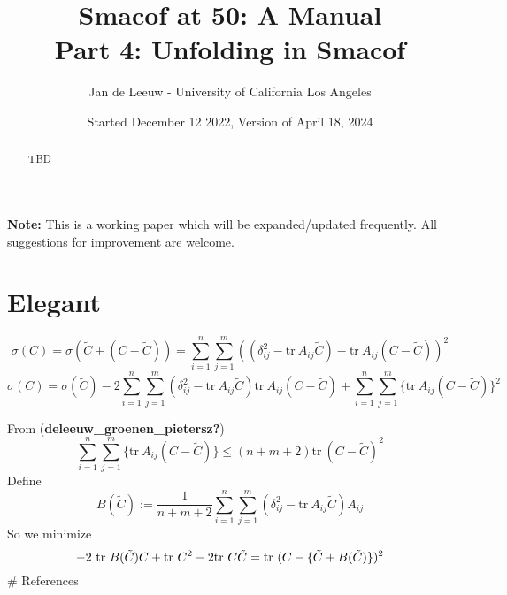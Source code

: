 \documentclass[
  12pt,
]{article}
\title{Smacof at 50: A Manual\\
Part 4: Unfolding in Smacof}
\author{Jan de Leeuw - University of California Los Angeles}
\date{Started December 12 2022, Version of April 18, 2024}
\begin{document}
\maketitle
\begin{abstract}
TBD
\end{abstract}

{
\setcounter{tocdepth}{3}
\tableofcontents
}
\textbf{Note:} This is a working paper which will be expanded/updated frequently. All suggestions for improvement are welcome.

\section{Elegant}\label{elegant}

\[
\sigma(C)=\sigma(\tilde C+(C-\tilde C))=\sum_{i=1}^n\sum_{j=1}^m((\delta_{ij}^2-\text{tr}\ A_{ij}\tilde C)-\text{tr}\ A_{ij}(C-\tilde C))^2
\]
\[
\sigma(C)=\sigma(\tilde C)-2\sum_{i=1}^n\sum_{j=1}^m(\delta_{ij}^2-\text{tr}\ A_{ij}\tilde C)\text{tr}\ A_{ij}(C-\tilde C)+\sum_{i=1}^n\sum_{j=1}^m\{\text{tr}\ A_{ij}(C-\tilde C)\}^2
\]

From (\textbf{deleeuw\_groenen\_pietersz?})
\[
\sum_{i=1}^n\sum_{j=1}^m\{\text{tr}\ A_{ij}(C-\tilde C)\}\leq (n+m+2)\text{tr}\ (C-\tilde C)^2
\]
Define
\[
B(\tilde C):=\frac{1}{n+m+2}\sum_{i=1}^n\sum_{j=1}^m(\delta_{ij}^2-\text{tr}\ A_{ij}\tilde C)A_{ij}
\]
So we minimize
\[
-2\ \text{tr}\ B(\tilde C)C+\text{tr}\ C^2-2\text{tr}\ C\tilde C=\\
\text{tr}\ (C-\{\tilde C + B(\tilde C)\})^2
\]
\# References
\end{document}
